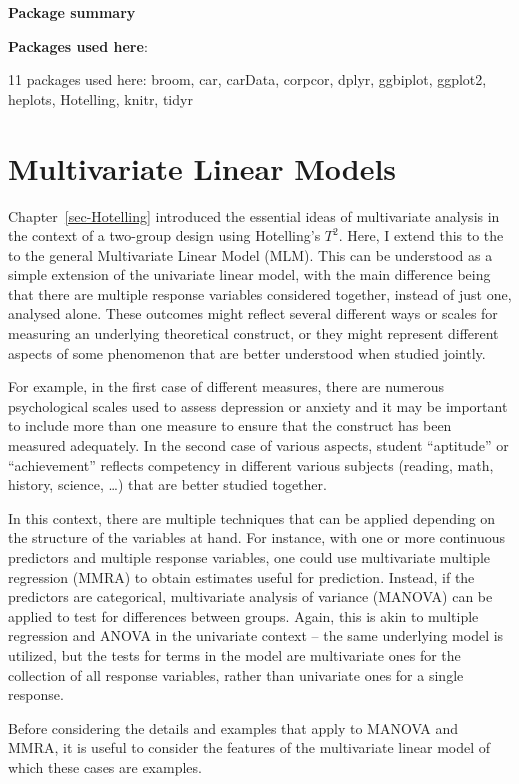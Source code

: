 \documentclass[
  letterpaper,
  10pt,
  krantz2]{krantz}
\begin{document}
\textbf{Package summary}

\textbf{Packages used here}:

11 packages used here: broom, car, carData, corpcor, dplyr, ggbiplot,
ggplot2, heplots, Hotelling, knitr, tidyr

\chapter{Multivariate Linear Models}\label{sec-mlm-review}

Chapter~\ref{sec-Hotelling} introduced the essential ideas of
multivariate analysis in the context of a two-group design using
Hotelling's \(T^2\). Here, I extend this to the to the general
Multivariate Linear Model (MLM). This can be understood as a simple
extension of the univariate linear model, with the main difference being
that there are multiple response variables considered together, instead
of just one, analysed alone. These outcomes might reflect several
different ways or scales for measuring an underlying theoretical
construct, or they might represent different aspects of some phenomenon
that are better understood when studied jointly.

For example, in the first case of different measures, there are numerous
psychological scales used to assess depression or anxiety and it may be
important to include more than one measure to ensure that the construct
has been measured adequately. In the second case of various aspects,
student ``aptitude'' or ``achievement'' reflects competency in different
various subjects (reading, math, history, science, \ldots) that are
better studied together.

In this context, there are multiple techniques that can be applied
depending on the structure of the variables at hand. For instance, with
one or more continuous predictors and multiple response variables, one
could use multivariate multiple regression (MMRA) to obtain estimates
useful for prediction. Instead, if the predictors are categorical,
multivariate analysis of variance (MANOVA) can be applied to test for
differences between groups. Again, this is akin to multiple regression
and ANOVA in the univariate context -- the same underlying model is
utilized, but the tests for terms in the model are multivariate ones for
the collection of all response variables, rather than univariate ones
for a single response.

Before considering the details and examples that apply to MANOVA and
MMRA, it is useful to consider the features of the multivariate linear
model of which these cases are examples.
\end{document}
